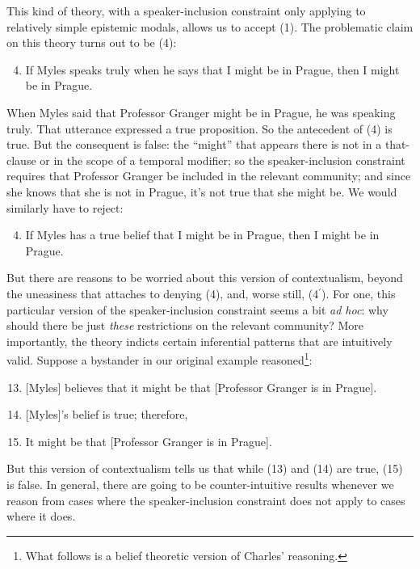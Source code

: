 This kind of theory, with a speaker-inclusion constraint only applying to relatively simple epistemic modals, allows us to accept (1). The problematic claim on this theory turns out to be (4):
 
\begin{enumerate} 
\setcounter{enumi}{3}
\item If Myles speaks truly when he says that I might be in Prague, then I might be in Prague.
\end{enumerate} 
 
\noindent When Myles said that Professor Granger might be in Prague, he was speaking truly. That utterance expressed a true proposition. So the antecedent of (4) is true. But the consequent is false: the ``might'' that appears there is not in a that-clause or in the scope of a temporal modifier; so the speaker-inclusion constraint requires that Professor Granger be included in the relevant community; and since she knows that she is not in Prague, it's not true that she might be. We would similarly have to reject:
 
\begin{enumerate}
\setcounter{enumi}{3}
\renewcommand{\labelenumi}{(\arabic{enumi}$^\prime$)}
\item If Myles has a true belief that I might be in Prague, then I might be in Prague.
\end{enumerate}
 
\noindent But there are reasons to be worried about this version of contextualism, beyond the uneasiness that attaches to denying (4), and, worse still, (4$^\prime$). For one, this particular version of the speaker-inclusion constraint seems a bit \textit{ad hoc}: why should there be just \textit{these} restrictions on the relevant community? More importantly, the theory indicts certain inferential patterns that are intuitively valid. Suppose a bystander in our original example reasoned\footnote{What follows is a belief theoretic 
version of Charles' reasoning. }:
 
\begin{enumerate}
\setcounter{enumi}{12} 
\item {}[Myles] believes that it might be that [Professor Granger is in Prague].
\item {}[Myles]'s belief is true; therefore,
\item It might be that [Professor Granger is in Prague].
\end{enumerate}
 
But this version of contextualism tells us that while (13) and (14) are true, (15) is false. In general, there are going to be counter-intuitive results whenever we reason from cases where the speaker-inclusion constraint does not apply to cases where it does. 
 
